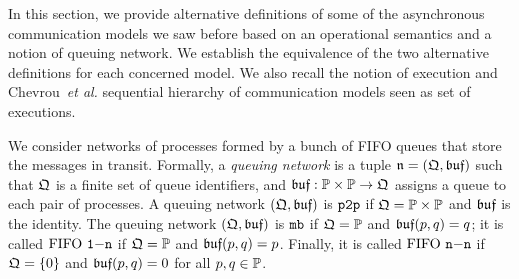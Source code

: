 
In this section, we provide alternative definitions of some of the asynchronous communication models we saw before
based on an operational semantics and a notion of queuing network. We establish the equivalence
of the two alternative definitions for each concerned model. We also recall the notion of
execution and Chevrou~\emph{et al.} sequential hierarchy of communication models seen as set of
executions.


We consider networks of processes formed by a bunch of FIFO queues that store the messages in transit.
Formally, a \emph{queuing network} is a tuple $\mathfrak{n}=(\mathfrak{Q},\mathfrak{buf})$ such that
$\mathfrak{Q}$ is a finite set of queue identifiers, and
$\mathfrak{buf}:\mathbb{P}\times\mathbb{P}\to \mathfrak{Q}$ assigns a queue to each
pair of processes.
A queuing network $(\mathfrak{Q},\mathfrak{buf})$ is $\mathtt{p2p}$ if
$\mathfrak{Q}=\mathbb{P}\times\mathbb{P}$ and $\mathfrak{buf}$ is the identity.
The queuing network $(\mathfrak{Q},\mathfrak{buf})$ is $\mathtt{mb}$ if
$\mathfrak{Q}=\mathbb{P}$ and $\mathfrak{buf}(p,q)=q$; it is called $\text{FIFO } \mathtt{1\mathsf{-}n}$ if
$\mathfrak{Q}=\mathbb{P}$ and $\mathfrak{buf}(p,q)=p$. Finally, it is called
$\text{FIFO } \mathtt{n\mathsf{-}n}$ if $\mathfrak{Q}=\{0\}$ and $\mathfrak{buf}(p,q)=0$ for all $p,q\in\mathbb{P}$.

